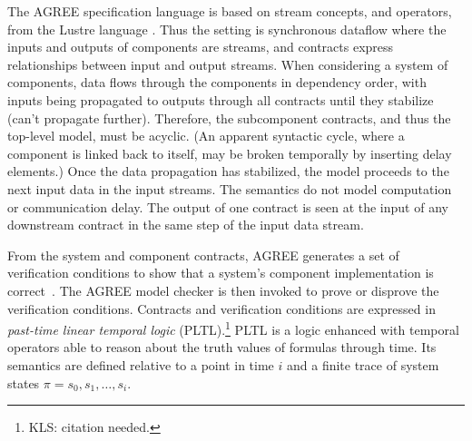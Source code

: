 
\newcommand{\globally}{\ensuremath{\mathbf{G}}}
\newcommand{\historically}{\ensuremath{\mathbf{H}}}
\newcommand{\assumes}{\ensuremath{A}}
\newcommand{\guarantees}{\ensuremath{P}}
\newcommand{\dispatch}{\ensuremath{\mathit{dispatch}}}
\newcommand{\complete}{\ensuremath{\mathit{complete}}}
\newcommand{\same}[1]{\ensuremath{\mathit{same}(#1)}}
\newcommand{\inputs}{\ensuremath{I}}
\newcommand{\outputs}{\ensuremath{O}}
\newcommand{\system}{\ensuremath{S}}
\newcommand{\components}{\ensuremath{C}}
\newcommand{\component}{\ensuremath{c}}
\newcommand{\schedule}{\ensuremath{\phi}}
\newcommand{\valid}{\ensuremath{\mathit{valid}}}
\newcommand{\dpred}{\ensuremath{\delta^\phi}}
\newcommand{\dispred}{\ensuremath{\mathbb{D}^\phi}}
\newcommand{\compred}{\ensuremath{\mathbb{C}^\phi}}
\newcommand{\dispredp}{\ensuremath{\mathbb{D}^{\phi\prime}}}
\newcommand{\compredp}{\ensuremath{\mathbb{C}^{\phi\prime}}}

The AGREE specification language is based on stream concepts, and
operators, from the Lustre language \cite{10.1145/41625.41641}. Thus
the setting is synchronous dataflow where the inputs and outputs of
components are streams, and contracts express relationships between
input and output streams. When considering a system of components,
data flows through the components in dependency order, with inputs
being propagated to outputs through all contracts until they stabilize
(can't propagate further). Therefore, the subcomponent contracts, and
thus the top-level model, must be acyclic. (An apparent syntactic
cycle, where a component is linked back to itself, may be broken
temporally by inserting delay elements.)  Once the data propagation
has stabilized, the model proceeds to the next input data in the input
streams. The semantics do not model computation or communication
delay. The output of one contract is seen at the input of any
downstream contract in the same step of the input data stream.

From the system and component contracts, AGREE generates a set of
verification conditions to show that a system's component
implementation is correct~\cite{agree2013}.  The AGREE model checker
is then invoked to prove or disprove the verification
conditions. Contracts and verification conditions are expressed in
\emph{past-time linear temporal logic} (PLTL).\footnote{KLS: citation
needed.}  PLTL is a logic enhanced with temporal operators able to
reason about the truth values of formulas through time.  Its semantics
are defined relative to a point in time $i$ and a finite trace of
system states $\pi = s_0, s_1, \ldots, s_i$.

